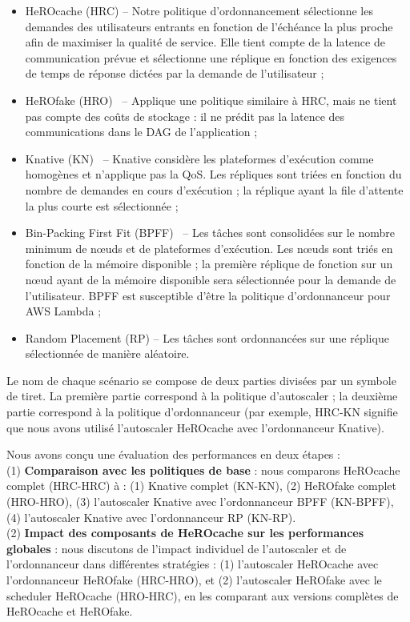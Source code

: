 \begin{itemize}
    \item HeROcache (HRC) -- Notre politique d'ordonnancement sélectionne les demandes des utilisateurs entrants en fonction de l'échéance la plus proche afin de maximiser la qualité de service. Elle tient compte de la latence de communication prévue et sélectionne une réplique en fonction des exigences de temps de réponse dictées par la demande de l'utilisateur ;
    \item HeROfake (HRO)~\cite{herofake} -- Applique une politique similaire à HRC, mais ne tient pas compte des coûts de stockage : il ne prédit pas la latence des communications dans le DAG de l'application ;
    \item Knative (KN)~\cite{knative} -- Knative considère les plateformes d'exécution comme homogènes et n'applique pas la QoS. Les répliques sont triées en fonction du nombre de demandes en cours d'exécution ; la réplique ayant la file d'attente la plus courte est sélectionnée ;
    \item Bin-Packing First Fit (BPFF)~\cite{wangPeekingCurtainsServerlessb} -- Les tâches sont consolidées sur le nombre minimum de nœuds et de plateformes d'exécution. Les nœuds sont triés en fonction de la mémoire disponible ; la première réplique de fonction sur un nœud ayant de la mémoire disponible sera sélectionnée pour la demande de l'utilisateur. BPFF est susceptible d'être la politique d'ordonnanceur pour AWS Lambda ;
    \item Random Placement (RP) -- Les tâches sont ordonnancées sur une réplique sélectionnée de manière aléatoire.
\end{itemize}

Le nom de chaque scénario se compose de deux parties divisées par un symbole de tiret. La première partie correspond à la politique d'autoscaler ; la deuxième partie correspond à la politique d'ordonnanceur (par exemple, HRC-KN signifie que nous avons utilisé l'autoscaler HeROcache avec l'ordonnanceur Knative).

Nous avons conçu une évaluation des performances en deux étapes : \\
(1) \textbf{Comparaison avec les politiques de base} : nous comparons HeROcache complet (HRC-HRC) à : (1) Knative complet (KN-KN), (2) HeROfake complet (HRO-HRO), (3) l'autoscaler Knative avec l'ordonnanceur BPFF (KN-BPFF), (4) l'autoscaler Knative avec l'ordonnanceur RP (KN-RP). \\
(2) \textbf{Impact des composants de HeROcache sur les performances globales} : nous discutons de l'impact individuel de l'autoscaler et de l'ordonnanceur dans différentes stratégies : (1) l'autoscaler HeROcache avec l'ordonnanceur HeROfake (HRC-HRO), et (2) l'autoscaler HeROfake avec le scheduler HeROcache (HRO-HRC), en les comparant aux versions complètes de HeROcache et HeROfake.

